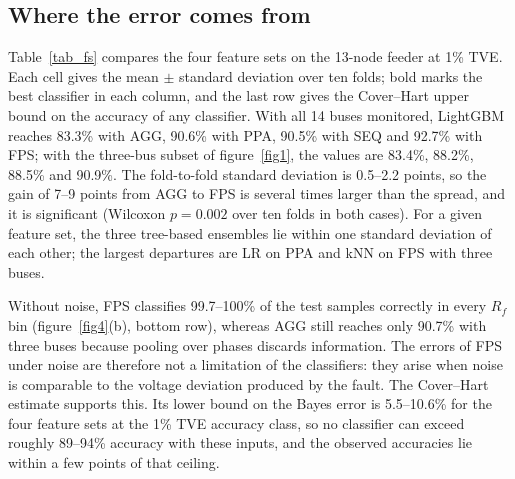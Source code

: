 \documentclass[11pt]{article}
\newenvironment{nw}{}{}
\begin{document}
\begin{nw}
\subsection{Where the error comes from}\label{subsec5_0}

Table~\ref{tab_fs} compares the four feature sets on the 13-node feeder at 1\% TVE. Each cell gives the mean $\pm$ standard deviation over ten folds; bold marks the best classifier in each column, and the last row gives the Cover--Hart upper bound on the accuracy of any classifier. With all 14 buses monitored, LightGBM reaches 83.3\% with AGG, 90.6\% with PPA, 90.5\% with SEQ and 92.7\% with FPS; with the three-bus subset of figure~\ref{fig1}, the values are 83.4\%, 88.2\%, 88.5\% and 90.9\%. The fold-to-fold standard deviation is 0.5--2.2 points, so the gain of 7--9 points from AGG to FPS is several times larger than the spread, and it is significant (Wilcoxon $p=0.002$ over ten folds in both cases). For a given feature set, the three tree-based ensembles lie within one standard deviation of each other; the largest departures are LR on PPA and kNN on FPS with three buses.

Without noise, FPS classifies 99.7--100\% of the test samples correctly in every $R_f$ bin (figure~\ref{fig4}(b), bottom row), whereas AGG still reaches only 90.7\% with three buses because pooling over phases discards information. The errors of FPS under noise are therefore not a limitation of the classifiers: they arise when noise is comparable to the voltage deviation produced by the fault. The Cover--Hart estimate supports this. Its lower bound on the Bayes error is 5.5--10.6\% for the four feature sets at the 1\% TVE accuracy class, so no classifier can exceed roughly 89--94\% accuracy with these inputs, and the observed accuracies lie within a few points of that ceiling.

\end{nw}
\end{document}

